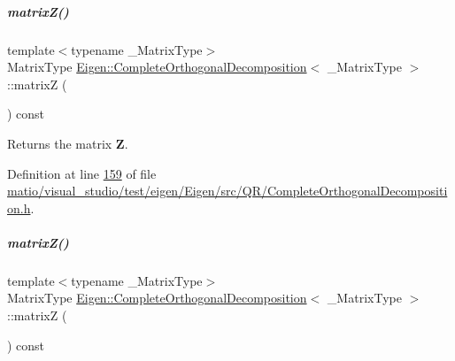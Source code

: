 \mbox{\label{group___q_r___module_a4cd178f13aefe5189d4beeb3eb1c5897}} 
\subparagraph{\texorpdfstring{matrix\+Z()}{matrixZ()}\hspace{0.1cm}{\footnotesize\ttfamily [1/2]}}
{\footnotesize\ttfamily template$<$typename \+\_\+\+Matrix\+Type$>$ \\
Matrix\+Type \hyperlink{group___q_r___module_class_eigen_1_1_complete_orthogonal_decomposition}{Eigen\+::\+Complete\+Orthogonal\+Decomposition}$<$ \+\_\+\+Matrix\+Type $>$\+::matrixZ (\begin{DoxyParamCaption}{ }\end{DoxyParamCaption}) const\hspace{0.3cm}{\ttfamily [inline]}}

\begin{DoxyReturn}{Returns}
the matrix {\bfseries Z}. 
\end{DoxyReturn}


Definition at line \hyperlink{matio_2visual__studio_2test_2eigen_2_eigen_2src_2_q_r_2_complete_orthogonal_decomposition_8h_source_l00159}{159} of file \hyperlink{matio_2visual__studio_2test_2eigen_2_eigen_2src_2_q_r_2_complete_orthogonal_decomposition_8h_source}{matio/visual\+\_\+studio/test/eigen/\+Eigen/src/\+Q\+R/\+Complete\+Orthogonal\+Decomposition.\+h}.

\mbox{\label{group___q_r___module_a4cd178f13aefe5189d4beeb3eb1c5897}} 
\subparagraph{\texorpdfstring{matrix\+Z()}{matrixZ()}\hspace{0.1cm}{\footnotesize\ttfamily [2/2]}}
{\footnotesize\ttfamily template$<$typename \+\_\+\+Matrix\+Type$>$ \\
Matrix\+Type \hyperlink{group___q_r___module_class_eigen_1_1_complete_orthogonal_decomposition}{Eigen\+::\+Complete\+Orthogonal\+Decomposition}$<$ \+\_\+\+Matrix\+Type $>$\+::matrixZ (\begin{DoxyParamCaption}{ }\end{DoxyParamCaption}) const\hspace{0.3cm}{\ttfamily [inline]}}

